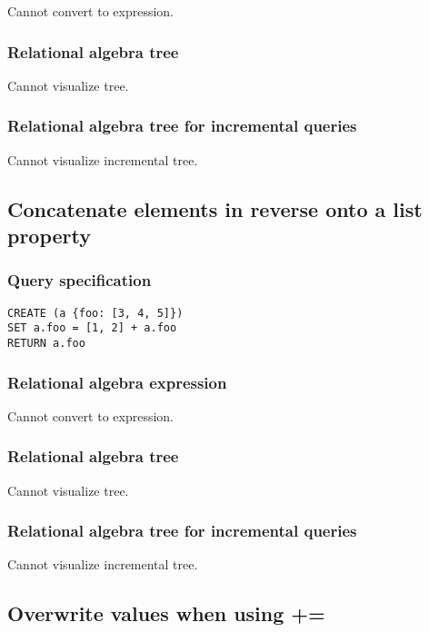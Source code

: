 Cannot convert to expression.

\subsubsection*{Relational algebra tree}

Cannot visualize tree.

\subsubsection*{Relational algebra tree for incremental queries}

Cannot visualize incremental tree.

\subsection{Concatenate elements in reverse onto a list property}

\subsubsection*{Query specification}

\begin{lstlisting}
CREATE (a {foo: [3, 4, 5]})
SET a.foo = [1, 2] + a.foo
RETURN a.foo
\end{lstlisting}

\subsubsection*{Relational algebra expression}

Cannot convert to expression.

\subsubsection*{Relational algebra tree}

Cannot visualize tree.

\subsubsection*{Relational algebra tree for incremental queries}

Cannot visualize incremental tree.

\subsection{Overwrite values when using +=}

